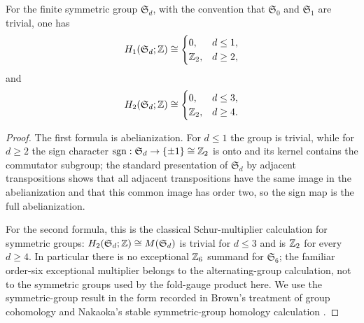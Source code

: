 \begin{lemma}\label{lem:symmetric-group-low-degree-homology-background}
For the finite symmetric group \(\mathfrak S_d\), with the convention that \(\mathfrak S_0\) and \(\mathfrak S_1\) are trivial, one has
\[
H_1(\mathfrak S_d;\mathbb{Z})\cong
\begin{cases}
0,&d\le 1,\\
\mathbb{Z}_2,&d\ge 2,
\end{cases}
\]
and
\[
H_2(\mathfrak S_d;\mathbb{Z})\cong
\begin{cases}
0,&d\le 3,\\
\mathbb{Z}_2,&d\ge 4.
\end{cases}
\]
\end{lemma}

\begin{proof}
The first formula is abelianization.  For \(d\le1\) the group is trivial, while for \(d\ge2\) the sign character \(\operatorname{sgn}:\mathfrak S_d\to\{\pm1\}\cong\mathbb{Z}_2\) is onto and its kernel contains the commutator subgroup; the standard presentation of \(\mathfrak S_d\) by adjacent transpositions shows that all adjacent transpositions have the same image in the abelianization and that this common image has order two, so the sign map is the full abelianization.

For the second formula, this is the classical Schur-multiplier calculation for symmetric groups: \(H_2(\mathfrak S_d;\mathbb{Z})\cong M(\mathfrak S_d)\) is trivial for \(d\le3\) and is \(\mathbb{Z}_2\) for every \(d\ge4\).  In particular there is no exceptional \(\mathbb{Z}_6\) summand for \(\mathfrak S_6\); the familiar order-six exceptional multiplier belongs to the alternating-group calculation, not to the symmetric groups used by the fold-gauge product here.  We use the symmetric-group result in the form recorded in Brown's treatment of group cohomology and Nakaoka's stable symmetric-group homology calculation \cite{brown1982cohomology,nakaoka1961homology}. \qedhere
\end{proof}

